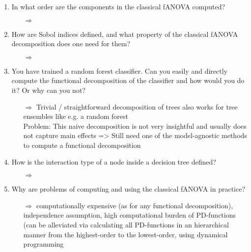 \begin{enumerate}
    \item 
    In what order are the components in the classical fANOVA computed?
    \begin{itemize}
        \item[$\Rightarrow$] 
    \end{itemize}
    \item 
    How are Sobol indices defined, and what property of the classical fANOVA decomposition does one need for them?
    \begin{itemize}
        \item[$\Rightarrow$] 
    \end{itemize}
    \item
    You have trained a random forest classifier. Can you easily and directly compute the functional decomposition of the classifier and how would you do it? Or why can you not?
    \begin{itemize}
        \item[$\Rightarrow$] 
        Trivial / straightforward decomposition of trees also works for tree ensembles like e.g. a random forest \\
        Problem: This naive decomposition is not very insightful and usually does not capture main effects => Still need one of the model-agnostic methods to compute a functional decomposition
    \end{itemize}
    \item 
    How is the interaction type of a node inside a decision tree defined?
    \begin{itemize}
        \item[$\Rightarrow$] 
    \end{itemize}
    \item 
    Why are problems of computing and using the classical fANOVA in practice?
    \begin{itemize}
        \item[$\Rightarrow$] computationally expensive (as for any functional decomposition), independence assumption, high computational burden of PD-functions (can be alleviated via calculating all PD-functions in an hierarchical manner from the highest-order to the lowest-order, using dynamical programming
    \end{itemize}

\end{enumerate}
